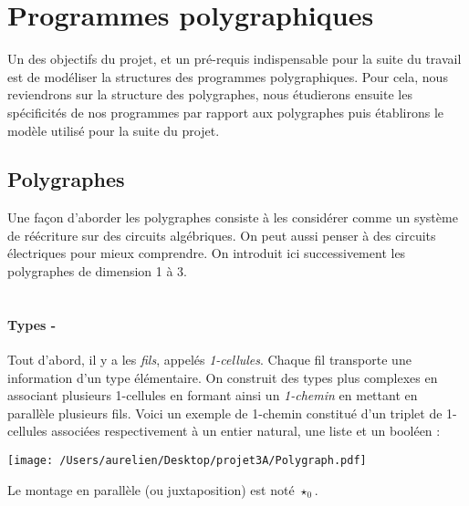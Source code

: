 \documentclass[a4paper,11pt,titlepage]{article}
\begin{document}
\section{Programmes polygraphiques}
Un des objectifs du projet, et un pr\'{e}-requis indispensable pour la suite du travail est de mod\'{e}liser la structures des programmes polygraphiques. Pour cela, nous reviendrons sur la structure des polygraphes, nous \'{e}tudierons ensuite les sp\'{e}cificit\'{e}s de nos programmes par rapport aux polygraphes puis \'{e}tablirons le mod\`{e}le utilis\'{e} pour la suite du projet.
\subsection{Polygraphes}
Une fa\c{c}on d'aborder les polygraphes consiste \`{a} les consid\'{e}rer comme un syst\`{e}me de r\'{e}\'{e}criture sur des circuits alg\'{e}briques. On peut aussi penser \`{a} des circuits \'{e}lectriques pour mieux comprendre. On introduit ici successivement les polygraphes de dimension 1 \`{a} 3.\\\\
\paragraph{Types -}
Tout d'abord, il y a les \textit{fils}, appel\'{e}s \textit{1-cellules}. Chaque fil transporte une information d'un type \'{e}l\'{e}mentaire. On construit des types plus complexes en associant plusieurs 1-cellules en formant ainsi un \textit{1-chemin} en mettant en parall\`{e}le plusieurs fils. Voici un exemple de 1-chemin constitu\'{e} d'un triplet de 1-cellules associ\'{e}es respectivement \`{a} un entier natural, une liste et un bool\'{e}en :
\begin{center}\texttt{[image: /Users/aurelien/Desktop/projet3A/Polygraph.pdf]}\end{center}
Le montage en parall\`{e}le (ou juxtaposition) est not\'{e} $\star_{0}$.
\end{document}
